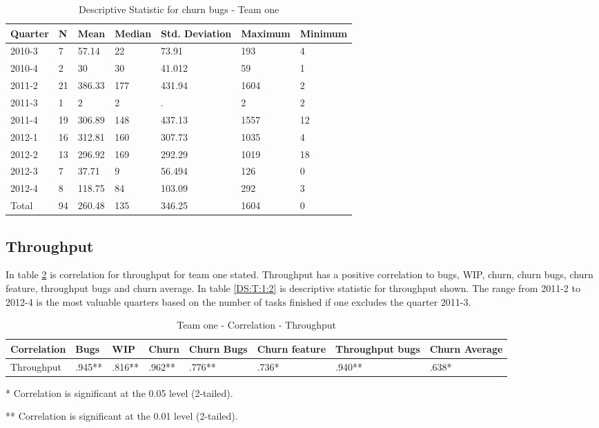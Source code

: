 \documentclass[UKenglish]{ifimaster}  %
\begin{document}
\begin{table}[!htbp]
\centering
\begin{tabular}{ | l | l | l | l | l | l | l | }
\hline
	Quarter & N & Mean & Median & Std. Deviation & Maximum & Minimum \\ \hline
	2010-3 & 7 & 57.14 & 22 & 73.91 & 193 & 4 \\ \hline
	2010-4 & 2 & 30 & 30 & 41.012 & 59 & 1 \\ \hline
	2011-2 & 21 & 386.33 & 177 & 431.94& 1604 & 2 \\ \hline
	2011-3 & 1 & 2 & 2 & . & 2 & 2 \\ \hline
	2011-4 & 19 & 306.89 & 148 & 437.13 & 1557 & 12 \\ \hline
	2012-1 & 16 & 312.81 & 160 & 307.73& 1035 & 4 \\ \hline
	2012-2 & 13 & 296.92 & 169 & 292.29 & 1019 & 18 \\ \hline
	2012-3 & 7 & 37.71 & 9 & 56.494 & 126 & 0 \\ \hline
	2012-4 & 8 & 118.75 & 84 & 103.09 & 292 & 3 \\ \hline
	Total & 94 & 260.48 & 135 & 346.25 & 1604 & 0 \\ \hline
\end{tabular}
 \caption{Descriptive Statistic for churn bugs - Team one}
  \label{DS:CB:1}%
\end{table}%
 \newpage 

\subsection{Throughput}
In table \ref{TP:C:1} is correlation for throughput for team one stated. Throughput has a positive correlation to bugs, WIP, churn, churn bugs, churn feature, throughput bugs and churn average. In table \ref{DS:T:1:2} is descriptive statistic for throughput shown. The range from 2011-2 to 2012-4 is the most valuable quarters based on the number of tasks finished if one excludes the quarter 2011-3.
\begin{table}[!htbp] 
 \centering
 \hspace*{-0.5in} 
 \begin{tabular}{|l|l|l|l|l|l|l|l|} 
\hline 
Correlation  & Bugs & WIP & Churn & Churn Bugs & Churn feature & Throughput bugs & Churn Average \\ \hline 
	Throughput & .945** & .816** & .962** & .776** & .736* & .940** & .638* \\ \hline
\end{tabular} 
 \caption{Team one - Correlation - 	Throughput} 
 \label{TP:C:1}
     \centerline {* Correlation is significant at the 0.05 level (2-tailed).}
      \centerline{  ** Correlation is significant at the 0.01 level (2-tailed).}
 \end{table} 
 
\end{document}
